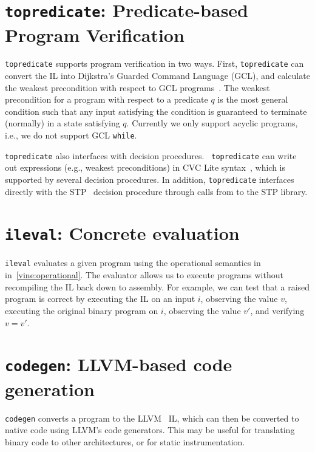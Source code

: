 \section{{\tt topredicate}: Predicate-based Program Verification}

{\tt topredicate} supports program verification in two ways. First,
{\tt topredicate} can convert the IL into Dijkstra's Guarded Command
Language (GCL), and calculate the weakest precondition with respect to
GCL programs~\cite{dijkstra:1976}. The weakest precondition for a
program with respect to a predicate $q$ is the most general condition
such that any input satisfying the condition is guaranteed to
terminate (normally) in a state satisfying $q$.  Currently we only
support acyclic programs, i.e., we do not support GCL {\tt while}.

{\tt topredicate} also interfaces with decision procedures.  {\tt
  topredicate} can write out expressions (e.g., weakest preconditions)
in CVC Lite syntax~\cite{cvclite}, which is supported by several
decision procedures. In addition, {\tt topredicate} interfaces
directly with the STP~\cite{ganesh:2007} decision procedure through
calls from \bap to the STP library.

\section{{\tt ileval}: Concrete evaluation} 

{\tt ileval} evaluates a given \bil
program using the operational semantics in in~\ref{vine:operational}.
The evaluator allows us to execute programs without recompiling the IL
back down to assembly. For example, we can test that a raised program
is correct by executing the IL on an input $i$, observing the value $v$,
executing the original binary program on $i$, observing the value
$v'$, and verifying $v = v'$.

\section{\texttt{codegen}: LLVM-based code generation}

\texttt{codegen} converts a \bil program to the LLVM~\cite{llvm} IL,
which can then be converted to native code using LLVM's code
generators.  This may be useful for translating binary code to other
architectures, or for static instrumentation.



